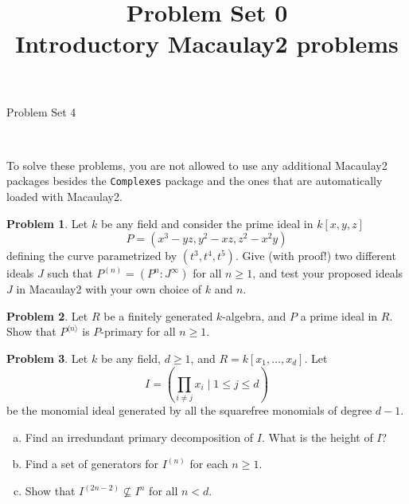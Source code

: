 \documentclass[11pt]{article}
\title{}
\date{\vspace{-0.5in}}
\title{Problem Set 0 \\ Introductory Macaulay2 problems}
\theoremstyle{definition}
\newtheorem{problem}{Problem}
\begin{document}
\thispagestyle{fancy}
\pagestyle{fancy}


\begin{center}
	{\LARGE Problem Set 4\\
	
	
}
\end{center}

\

To solve these problems, you are not allowed to use any additional Macaulay2 packages besides the \texttt{Complexes} package and the ones that are automatically loaded with Macaulay2.


\begin{problem}
	Let $k$ be any field and consider the prime ideal in $k[x,y,z]$
	$$P = (x^3-yz,y^2-xz,z^2-x^2y)$$
	defining the curve parametrized by $(t^3, t^4, t^5)$. Give (with proof!) two different ideals $J$ such that $P^{(n)} = (P^n : J^\infty)$ for all $n \geqslant 1$, and test your proposed ideals $J$ in Macaulay2 with your own choice of $k$ and $n$.
\end{problem}


\begin{problem}
	Let $R$ be a finitely generated $k$-algebra, and $P$ a prime ideal in $R$. Show that $P^{\langle n\rangle}$ is $P$-primary for all $n \geqslant 1$.
\end{problem}



\begin{problem}
	Let $k$ be any field, $d \geqslant 1$, and $R = k[x_1, \ldots, x_d]$. Let
	$$I = \left( \prod_{i \neq j} x_{i} \mid 1 \leqslant j \leqslant d \right)$$
	be the monomial ideal generated by all the squarefree monomials of degree $d-1$. 
	\begin{enumerate}[a)]
		\item Find an irredundant primary decomposition of $I$. What is the height of $I$?
		\item Find a set of generators for $I^{(n)}$ for each $n \geqslant 1$.
		\item Show that $I^{(2n-2)} \nsubseteq I^n$ for all $n < d$.
	\end{enumerate}
\end{problem}

%
\end{document}
